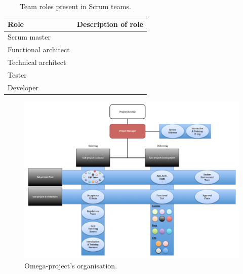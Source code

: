 \begin{table}[H]
\begin{center}
    \begin{tabular}{| p{4cm} | p{8cm} |}
    \hline
    \textbf{Role} & \textbf{Description of role} \\ \hline
    Scrum master & \\ \hline
    Functional architect & \\ \hline
    Technical architect & \\ \hline
    Tester & \\ \hline
    Developer & \\ \hline
    \end{tabular}
    \caption{Team roles present in Scrum teams.}
    \label{trpist}
\end{center}
\end{table}

\begin{figure}[H]
\centering
\includegraphics[trim = 40mm 0mm 7mm 0mm,width=180mm]{images/omega_organisation.png}
\caption{Omega-project's organisation.}
\label{omega}
\end{figure}

